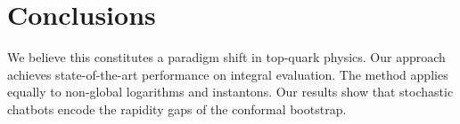 \section{Conclusions}\label{sec:conclusions}

We believe this constitutes a paradigm shift in top-quark physics. Our
approach achieves state-of-the-art performance on integral evaluation.
The method applies equally to non-global logarithms and instantons. Our
results show that stochastic chatbots encode the rapidity gaps of the
conformal bootstrap.

